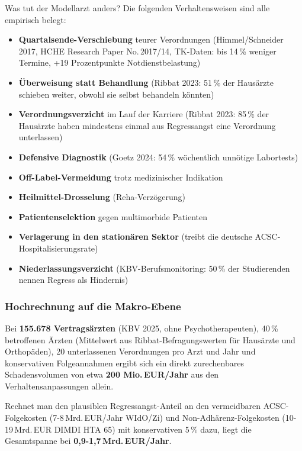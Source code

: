 \documentclass{umbruch-position}
\begin{document}
Was tut der Modellarzt anders? Die folgenden Verhaltensweisen sind alle empirisch belegt:

\begin{itemize}[nosep]
  \item \textbf{Quartalsende-Verschiebung} teurer Verordnungen (Himmel/Schneider 2017, HCHE Research Paper No.\,2017/14, TK-Daten: bis 14\,\% weniger Termine, +19 Prozentpunkte Notdienstbelastung)
  \item \textbf{Überweisung statt Behandlung} (Ribbat 2023: 51\,\% der Hausärzte schieben weiter, obwohl sie selbst behandeln könnten)
  \item \textbf{Verordnungsverzicht} im Lauf der Karriere (Ribbat 2023: 85\,\% der Hausärzte haben mindestens einmal aus Regressangst eine Verordnung unterlassen)
  \item \textbf{Defensive Diagnostik} (Goetz 2024: 54\,\% wöchentlich unnötige Labortests)
  \item \textbf{Off-Label-Vermeidung} trotz medizinischer Indikation
  \item \textbf{Heilmittel-Drosselung} (Reha-Verzögerung)
  \item \textbf{Patientenselektion} gegen multimorbide Patienten
  \item \textbf{Verlagerung in den stationären Sektor} (treibt die deutsche ACSC-Hospitalisierungsrate)
  \item \textbf{Niederlassungsverzicht} (KBV-Berufsmonitoring: 50\,\% der Studierenden nennen Regress als Hindernis)
\end{itemize}

\subsubsection{Hochrechnung auf die Makro-Ebene}

Bei \textbf{155.678 Vertragsärzten} (KBV 2025, ohne Psychotherapeuten), 40\,\% betroffenen Ärzten (Mittelwert aus Ribbat-Befragungswerten für Hausärzte und Orthopäden), 20 unterlassenen Verordnungen pro Arzt und Jahr und konservativen Folgeannahmen ergibt sich ein direkt zurechenbares Schadensvolumen von etwa \textbf{200 Mio.\,EUR/Jahr} aus den Verhaltensanpassungen allein.

Rechnet man den plausiblen Regressangst-Anteil an den vermeidbaren ACSC-Folgekosten (7-8\,Mrd.\,EUR/Jahr WIdO/Zi) und Non-Adhärenz-Folgekosten (10-19\,Mrd.\,EUR DIMDI HTA 65) mit konservativen 5\,\% dazu, liegt die Gesamtspanne bei \textbf{0,9-1,7\,Mrd.\,EUR/Jahr}.
\end{document}
